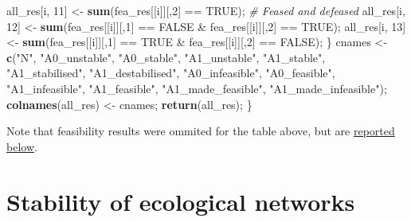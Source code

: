 \documentclass[]{article}
\newenvironment{Shaded}{\begin{snugshade}}{\end{snugshade}}
\newcommand{\KeywordTok}[1]{\textcolor[rgb]{0.13,0.29,0.53}{\textbf{{#1}}}}
\newcommand{\DecValTok}[1]{\textcolor[rgb]{0.00,0.00,0.81}{{#1}}}
\newcommand{\StringTok}[1]{\textcolor[rgb]{0.31,0.60,0.02}{{#1}}}
\newcommand{\CommentTok}[1]{\textcolor[rgb]{0.56,0.35,0.01}{\textit{{#1}}}}
\newcommand{\OtherTok}[1]{\textcolor[rgb]{0.56,0.35,0.01}{{#1}}}
\newcommand{\NormalTok}[1]{{#1}}
\begin{document}
\begin{Shaded}
\begin{Highlighting}[]
        \NormalTok{all_res[i, }\DecValTok{11}\NormalTok{]  <-}\StringTok{ }\KeywordTok{sum}\NormalTok{(fea_res[[i]][,}\DecValTok{2}\NormalTok{] ==}\StringTok{ }\OtherTok{TRUE}\NormalTok{);}
        \CommentTok{# Feased and defeased}
        \NormalTok{all_res[i, }\DecValTok{12}\NormalTok{] <-}\StringTok{ }\KeywordTok{sum}\NormalTok{(fea_res[[i]][,}\DecValTok{1}\NormalTok{] ==}\StringTok{ }\OtherTok{FALSE} \NormalTok{&}\StringTok{ }
\StringTok{                                  }\NormalTok{fea_res[[i]][,}\DecValTok{2}\NormalTok{] ==}\StringTok{ }\OtherTok{TRUE}\NormalTok{);}
        \NormalTok{all_res[i, }\DecValTok{13}\NormalTok{] <-}\StringTok{ }\KeywordTok{sum}\NormalTok{(fea_res[[i]][,}\DecValTok{1}\NormalTok{] ==}\StringTok{ }\OtherTok{TRUE} \NormalTok{&}\StringTok{ }
\StringTok{                                  }\NormalTok{fea_res[[i]][,}\DecValTok{2}\NormalTok{] ==}\StringTok{ }\OtherTok{FALSE}\NormalTok{);}
    \NormalTok{\}}
    \NormalTok{cnames <-}\StringTok{ }\KeywordTok{c}\NormalTok{(}\StringTok{"N"}\NormalTok{, }\StringTok{"A0_unstable"}\NormalTok{, }\StringTok{"A0_stable"}\NormalTok{, }\StringTok{"A1_unstable"}\NormalTok{, }\StringTok{"A1_stable"}\NormalTok{, }
                \StringTok{"A1_stabilised"}\NormalTok{, }\StringTok{"A1_destabilised"}\NormalTok{, }\StringTok{"A0_infeasible"}\NormalTok{, }
                \StringTok{"A0_feasible"}\NormalTok{, }\StringTok{"A1_infeasible"}\NormalTok{, }\StringTok{"A1_feasible"}\NormalTok{, }
                \StringTok{"A1_made_feasible"}\NormalTok{, }\StringTok{"A1_made_infeasible"}\NormalTok{);}
    \KeywordTok{colnames}\NormalTok{(all_res) <-}\StringTok{ }\NormalTok{cnames;}
    \KeywordTok{return}\NormalTok{(all_res);}
\NormalTok{\}}
\end{Highlighting}
\end{Shaded}

Note that feasibility results were ommited for the table above, but are
\protect\hyperlink{Feasibility}{reported below}.

\hypertarget{ecological}{\section{Stability of ecological
networks}\label{ecological}}
\end{document}
